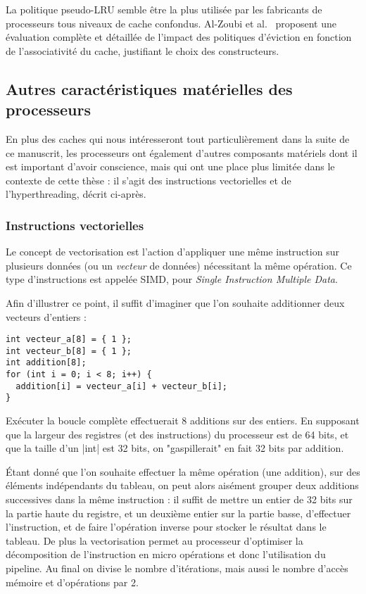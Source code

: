 La politique pseudo-LRU semble être la plus utilisée par les fabricants de processeurs tous niveaux de cache confondus. Al-Zoubi et al.~\cite{Al-Zoubi2004} proposent une évaluation complète et détaillée de l'impact des politiques d'éviction en fonction de l'associativité du cache, justifiant le choix des constructeurs.



\subsection{Autres caractéristiques matérielles des processeurs}\label{sec:context:numa:node}

En plus des caches qui nous intéresseront tout particulièrement dans la suite de ce manuscrit, les processeurs ont également d'autres composants matériels dont il est important d'avoir conscience, mais qui ont une place plus limitée dans le contexte de cette thèse : il s'agit des instructions vectorielles et de l'hyperthreading, décrit ci-après.

\subsubsection{Instructions vectorielles}\label{sec:context:numa:simd}

Le concept de vectorisation est l'action d'appliquer une même instruction sur plusieurs données (ou un \emph{vecteur} de données) nécessitant la même opération.
Ce type d'instructions est appelée SIMD, pour \emph{Single Instruction Multiple Data}.

Afin d'illustrer ce point, il suffit d'imaginer que l'on souhaite additionner deux vecteurs d'entiers :
\begin{lstlisting}
int vecteur_a[8] = { 1 };
int vecteur_b[8] = { 1 };
int addition[8];
for (int i = 0; i < 8; i++) {
  addition[i] = vecteur_a[i] + vecteur_b[i];
}
\end{lstlisting}

Exécuter la boucle complète effectuerait 8 additions sur des entiers.
En supposant que la largeur des registres (et des instructions) du processeur est de 64 bits, et que la taille d'un |int| est 32 bits, on "gaspillerait" en fait 32 bits par addition.

Étant donné que l'on souhaite effectuer la même opération (une addition), sur des éléments indépendants du tableau, on peut alors aisément grouper deux additions successives dans la même instruction : il suffit de mettre un entier de 32 bits sur la partie haute du registre, et un deuxième entier sur la partie basse, d'effectuer l'instruction, et de faire l'opération inverse pour stocker le résultat dans le tableau.
De plus la vectorisation permet au processeur d'optimiser la décomposition de l'instruction en micro opérations et donc l'utilisation du pipeline.
Au final on divise le nombre d'itérations, mais aussi le nombre d'accès mémoire et d'opérations par 2.


